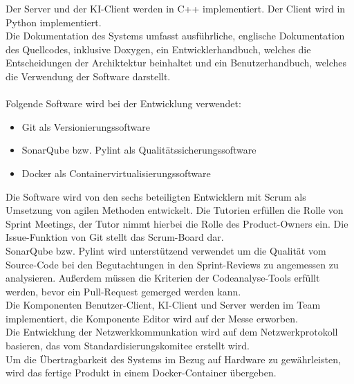 Der Server und der KI-Client werden in C++ implementiert. Der Client wird in Python implementiert.\\
Die Dokumentation des Systems umfasst ausführliche, englische Dokumentation des Quellcodes, inklusive Doxygen, ein Entwicklerhandbuch, welches die Entscheidungen der Archiktektur beinhaltet und ein Benutzerhandbuch, welches die Verwendung der Software darstellt.\\
\\
Folgende Software wird bei der Entwicklung verwendet:
\begin{itemize}
\item Git als Versionierungssoftware
	
\item SonarQube bzw. Pylint als Qualitätssicherungssoftware
	
\item Docker als Containervirtualisierungssoftware 
\end{itemize}
Die Software wird von den sechs beteiligten Entwicklern mit Scrum als Umsetzung von agilen Methoden entwickelt. Die Tutorien erfüllen die Rolle von Sprint Meetings, der Tutor nimmt hierbei die Rolle des Product-Owners ein. Die Issue-Funktion von Git stellt das Scrum-Board dar.\\
SonarQube bzw. Pylint wird unterstützend verwendet um die Qualität vom Source-Code bei den Begutachtungen in den Sprint-Reviews zu angemessen zu analysieren.
Außerdem müssen die Kriterien der Codeanalyse-Tools erfüllt werden, bevor ein Pull-Request gemerged werden kann.\\
Die Komponenten Benutzer-Client, KI-Client und Server werden im Team implementiert, die Komponente Editor wird auf der Messe erworben.\\
Die Entwicklung der Netzwerkkommunkation wird auf dem Netzwerkprotokoll basieren, das vom Standardisierungskomitee erstellt wird.\\
Um die Übertragbarkeit des Systems im Bezug auf Hardware zu gewährleisten, wird das fertige Produkt in einem Docker-Container übergeben.\\

